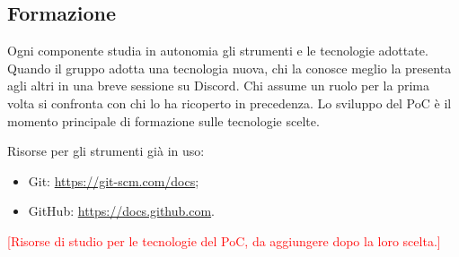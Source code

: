 \documentclass[12pt,a4paper]{article}
\newcommand{\ph}[1]{\textcolor{red}{[#1]}}
\newcommand{\tightlist}{\setlength{\itemsep}{1pt}\setlength{\parskip}{0pt}}
\begin{document}
\subsection{Formazione}
Ogni componente studia in autonomia gli strumenti e le tecnologie adottate. Quando il gruppo adotta una tecnologia nuova, chi la conosce meglio la presenta agli altri in una breve sessione su Discord. Chi assume un ruolo per la prima volta si confronta con chi lo ha ricoperto in precedenza. Lo sviluppo del PoC è il momento principale di formazione sulle tecnologie scelte.

Risorse per gli strumenti già in uso:
\begin{itemize}
\tightlist
\item Git: \url{https://git-scm.com/docs};
\item GitHub: \url{https://docs.github.com}.
\end{itemize}
\ph{Risorse di studio per le tecnologie del PoC, da aggiungere dopo la loro scelta.}
\end{document}
